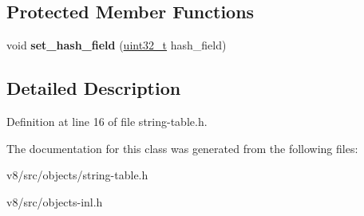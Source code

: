 \subsection*{Protected Member Functions}
\begin{DoxyCompactItemize}
\item 
\mbox{\label{classv8_1_1internal_1_1StringTableKey_aa7ce3ea24f952337cad1116e9714baea}} 
void {\bfseries set\+\_\+hash\+\_\+field} (\mbox{\hyperlink{classuint32__t}{uint32\+\_\+t}} hash\+\_\+field)
\end{DoxyCompactItemize}


\subsection{Detailed Description}


Definition at line 16 of file string-\/table.\+h.



The documentation for this class was generated from the following files\+:\begin{DoxyCompactItemize}
\item 
v8/src/objects/string-\/table.\+h\item 
v8/src/objects-\/inl.\+h\end{DoxyCompactItemize}
